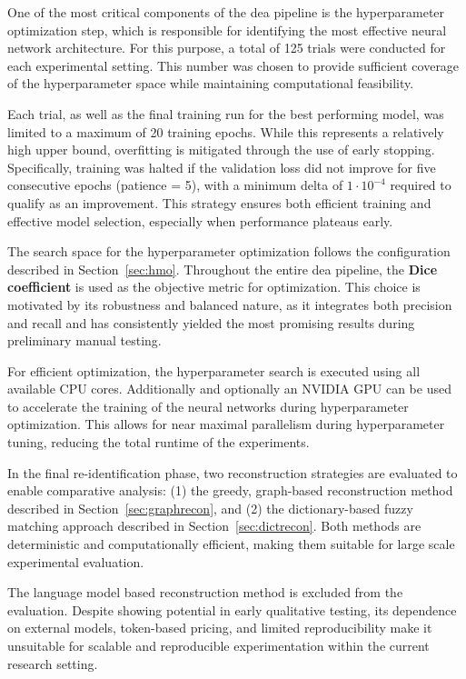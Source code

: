 One of the most critical components of the \ac{dea} pipeline is the hyperparameter optimization step, which is responsible for identifying the most effective neural network architecture.
For this purpose, a total of 125 trials were conducted for each experimental setting.
This number was chosen to provide sufficient coverage of the hyperparameter space while maintaining computational feasibility.

Each trial, as well as the final training run for the best performing model, was limited to a maximum of 20 training epochs.
While this represents a relatively high upper bound, overfitting is mitigated through the use of early stopping.
Specifically, training was halted if the validation loss did not improve for five consecutive epochs (patience = 5), with a minimum delta of $1 \cdot 10^{-4}$ required to qualify as an improvement.
This strategy ensures both efficient training and effective model selection, especially when performance plateaus early.

The search space for the hyperparameter optimization follows the configuration described in Section~\ref{sec:hmo}.
Throughout the entire \ac{dea} pipeline, the \textbf{Dice coefficient} is used as the objective metric for optimization.
This choice is motivated by its robustness and balanced nature, as it integrates both precision and recall and has consistently yielded the most promising results during preliminary manual testing.

For efficient optimization, the hyperparameter search is executed using all available CPU cores.
Additionally and optionally an NVIDIA GPU can be used to accelerate the training of the neural networks during hyperparameter optimization.
This allows for near maximal parallelism during hyperparameter tuning, reducing the total runtime of the experiments.

In the final re-identification phase, two reconstruction strategies are evaluated to enable comparative analysis: (1) the greedy, graph-based reconstruction method described in Section~\ref{sec:graphrecon}, and (2) the dictionary-based fuzzy matching approach described in Section~\ref{sec:dictrecon}.
Both methods are deterministic and computationally efficient, making them suitable for large scale experimental evaluation.

The language model based reconstruction method is excluded from the evaluation.
Despite showing potential in early qualitative testing, its dependence on external models, token-based pricing, and limited reproducibility make it unsuitable for scalable and reproducible experimentation within the current research setting.

